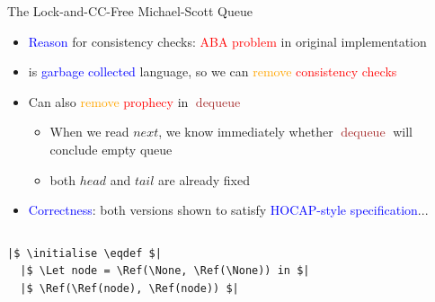 \documentclass[9pt,xcolor={dvipsnames}]{beamer}
\newcommand{\initialise}{\operatorname{initialize}}
\newcommand{\dequeue}{\operatorname{dequeue}}
\begin{document}
\begin{frame}[fragile]{The Lock-and-CC-Free Michael-Scott Queue}
  \begin{itemize}
    \item \textcolor{blue}{Reason} for consistency checks: \textcolor{red}{ABA problem} in original implementation
    \item \heaplang{} is \textcolor{blue}{garbage collected} language, so we can \textcolor{orange}{remove} \textcolor{red}{consistency checks}
    \item Can also \textcolor{orange}{remove} \textcolor{red}{prophecy} in \textcolor{Brown}{$\dequeue$}
      \begin{itemize}
        \item When we read $next$, we know immediately whether \textcolor{Brown}{$\dequeue$} will conclude empty queue
        \item both $head$ and $tail$ are already fixed
      \end{itemize}
    \item \textcolor{blue}{Correctness}: both versions shown to satisfy \textcolor{blue}{HOCAP-style specification}...
  \end{itemize}
  \vspace{-12pt}
  \begin{columns}
    \begin{column}{0.5\textwidth}
      \begin{verbatim}
|$ \initialise \eqdef $|
  |$ \Let node = \Ref(\None, \Ref(\None)) in $|
  |$ \Ref(\Ref(node), \Ref(node)) $|


\end{verbatim}
\end{column}
\end{columns}
\end{frame}
\end{document}
